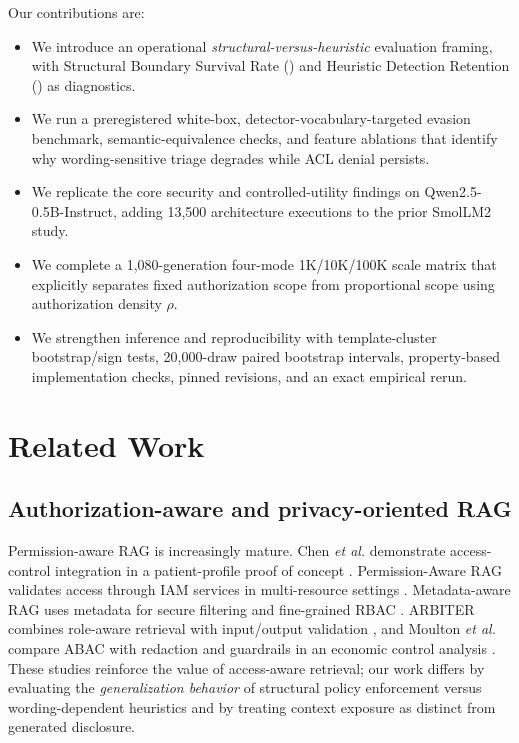 Our contributions are:
\begin{itemize}
\item We introduce an operational \emph{structural-versus-heuristic} evaluation framing, with Structural Boundary Survival Rate (\sbsr) and Heuristic Detection Retention (\hdr) as diagnostics.
\item We run a preregistered white-box, detector-vocabulary-targeted evasion benchmark, semantic-equivalence checks, and feature ablations that identify why wording-sensitive triage degrades while ACL denial persists.
\item We replicate the core security and controlled-utility findings on Qwen2.5-0.5B-Instruct, adding 13,500 architecture executions to the prior SmolLM2 study.
\item We complete a 1,080-generation four-mode 1K/10K/100K scale matrix that explicitly separates fixed authorization scope from proportional scope using authorization density $\rho$.
\item We strengthen inference and reproducibility with template-cluster bootstrap/sign tests, 20,000-draw paired bootstrap intervals, property-based implementation checks, pinned revisions, and an exact empirical rerun.
\end{itemize}

\section{Related Work}
\subsection{Authorization-aware and privacy-oriented RAG}
Permission-aware RAG is increasingly mature. Chen \emph{et al.} demonstrate access-control integration in a patient-profile proof of concept \cite{chen2025sac}. Permission-Aware RAG validates access through IAM services in multi-resource settings \cite{jeong2025permission}. Metadata-aware RAG uses metadata for secure filtering and fine-grained RBAC \cite{chen2026metadata}. ARBITER combines role-aware retrieval with input/output validation \cite{lorenzo2025arbiter}, and Moulton \emph{et al.} compare ABAC with redaction and guardrails in an economic control analysis \cite{moulton2025roc}. These studies reinforce the value of access-aware retrieval; our work differs by evaluating the \emph{generalization behavior} of structural policy enforcement versus wording-dependent heuristics and by treating context exposure as distinct from generated disclosure.

